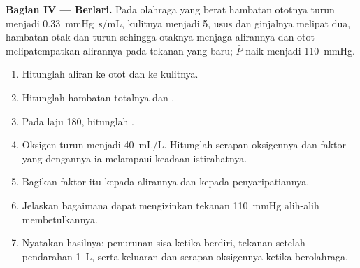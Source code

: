 \begin{problem}
\medskip
\noindent\textbf{Bagian IV --- Berlari.}
Pada olahraga yang berat hambatan ototnya turun menjadi
\qty{0.33}{mmHg.s/mL}, kulitnya menjadi 5, usus dan ginjalnya melipat
dua, hambatan otak dan  turun sehingga otaknya menjaga
alirannya dan otot  melipatempatkan alirannya pada tekanan
yang baru; $\bar P$ naik menjadi \qty{110}{mmHg}.
\begin{enumerate}[resume]
  \item Hitunglah aliran ke otot dan ke kulitnya.
  \item Hitunglah hambatan totalnya dan .
  \item Pada laju 180, hitunglah .
  \item Oksigen  turun menjadi \qty{40}{mL/L}. Hitunglah
        serapan oksigennya dan faktor yang dengannya ia melampaui
        keadaan istirahatnya.
  \item Bagikan faktor itu kepada alirannya dan kepada
        penyaripatiannya.
  \item Jelaskan bagaimana  dapat mengizinkan tekanan
        \qty{110}{mmHg} alih-alih membetulkannya.
  \item Nyatakan hasilnya: penurunan sisa ketika berdiri, tekanan
        setelah pendarahan \qty{1}{L}, serta keluaran dan serapan
        oksigennya ketika berolahraga.
\end{enumerate}
\end{problem}
